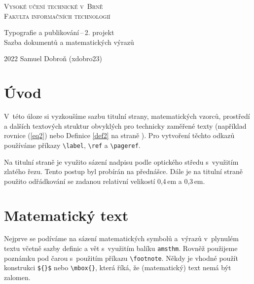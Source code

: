 \documentclass[twocolumn, 11pt, a4paper]{article}
\begin{document}
	\begin{titlepage}
		\begin{center}
			\textsc{
				\Huge{Vysoké učení technické v~Brně}\\[0,4em]
				\huge{Fakulta informačních technologií}
			}
		\end{center}
		\begin{center}
			\LARGE{
				Typografie a publikování\,--\,2. projekt\\
				\hspace{0.1em} Sazba dokumentů a matematických výrazů}
		\end{center}
    	{\Large 2022 \hfill Samuel Dobroň (xdobro23)}
	\end{titlepage}

\section*{Úvod}
	V~této úloze si vyzkoušíme sazbu titulní strany, ma\-te\-ma\-tic\-kých vzorců, prostředí a dalších textových struktur obvyklých pro technicky zaměřené texty (například rovnice (\ref{eq2}) nebo Definice \ref{def2} na straně \pageref{def2}). Pro vytvoření těchto odkazů používáme příkazy \verb|\label|, \verb|\ref| a \verb|\pageref|.
	
	Na titulní straně je využito sázení nadpisu podle optického středu s~využitím zlatého řezu. Tento postup byl probírán na přednášce. Dále je na titulní straně použito odřádkování se zadanou relativní velikostí 0,4\,em a 0,3\,em.

\section{Matematický text}
	Nejprve se podíváme na sázení matematických symbolů a~výrazů v~plynulém textu včetně sazby definic a vět s~využitím balíku \texttt{amsthm}. Rovněž použijeme poznámku pod čarou s~použitím příkazu \verb|\footnote|. Někdy je vhodné použít konstrukci \verb|${}$| nebo \verb|\mbox{}|, která říká, že (matematický) text nemá být zalomen. 
\end{document}
